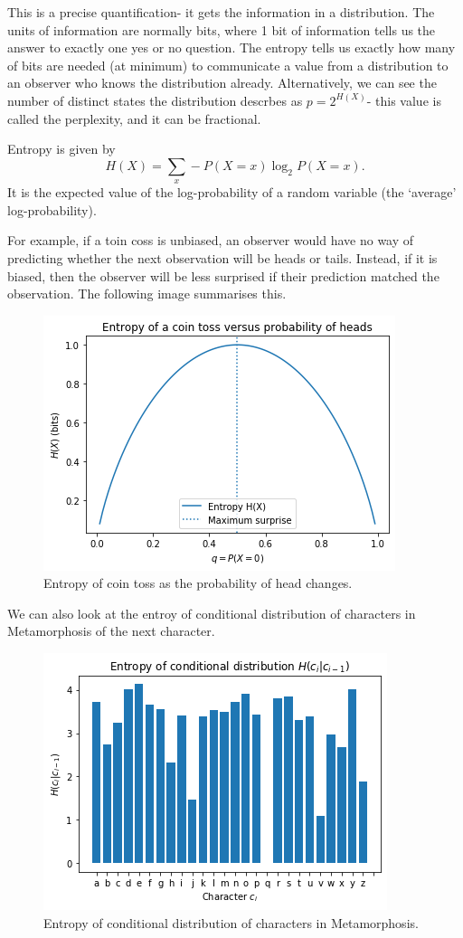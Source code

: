 \documentclass[a4paper, openany]{memoir}
\begin{document}
This is a precise quantification- it gets the information in a distribution. The units of information are normally bits, where 1 bit of information tells us the answer to exactly one yes or no question. The entropy tells us exactly how many of bits are needed (at minimum) to communicate a value from a distribution to an observer who knows the distribution already. Alternatively, we can see the number of distinct states the distribution descrbes as $p = 2^{H(X)}$- this value is called the perplexity, and it can be fractional.

Entropy is given by
\[H(X) = \sum_x -P(X = x) \log_2 P(X = x).\]
It is the expected value of the log-probability of a random variable (the `average' log-probability). 

For example, if a toin coss is unbiased, an observer would have no way of predicting whether the next observation will be heads or tails. Instead, if it is biased, then the observer will be less surprised if their prediction matched the observation. The following image summarises this.
\begin{figure}[H]
    \centering
    \includegraphics[scale=0.55]{src/5.10 entropy of coin toss.png}
    \caption{Entropy of coin toss as the probability of head changes.}
\end{figure}
\noindent We can also look at the entroy of conditional distribution of characters in Metamorphosis of the next character.
\begin{figure}[H]
    \centering
    \includegraphics[scale=0.55]{src/5.11 entroy of conditional distribution.png}
    \caption{Entropy of conditional distribution of characters in Metamorphosis.}
\end{figure}
\end{document}
